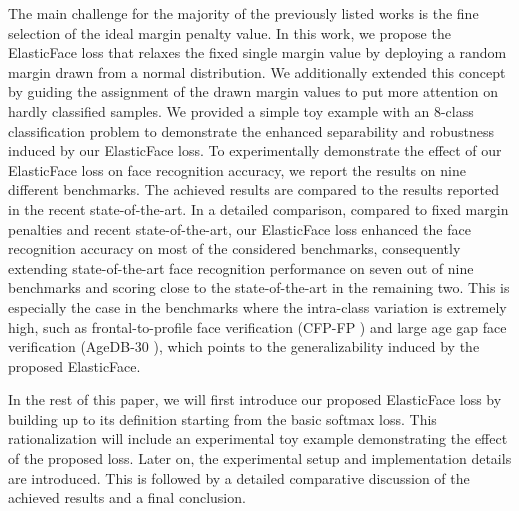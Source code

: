 \documentclass[letterpaper, 10 pt, conference]{ieeeconf}  \usepackage{times}
\begin{document}
The main challenge for the majority of the previously listed works is the fine selection of the ideal margin penalty value.
In this work, we propose the ElasticFace loss that relaxes the fixed single margin value by deploying a random margin drawn from a normal distribution. 
We additionally extended this concept by guiding the assignment of the drawn margin values to put more attention on hardly classified samples.
We provided a simple toy example with an 8-class classification problem to demonstrate the enhanced separability and robustness induced by our ElasticFace loss.
To experimentally demonstrate the effect of our ElasticFace loss on face recognition accuracy, we report the results on nine different benchmarks. 
The achieved results are compared to the results reported in the recent state-of-the-art.
In a detailed comparison, compared to fixed margin penalties and recent state-of-the-art, our ElasticFace loss enhanced the face recognition accuracy on most of the considered benchmarks, consequently extending state-of-the-art face recognition performance on seven out of nine benchmarks and scoring close to the state-of-the-art in the remaining two. This is especially the case in the benchmarks where the intra-class variation is extremely high, such as frontal-to-profile face verification (CFP-FP \cite{DBLP:conf/wacv/SenguptaCCPCJ16}) and large age gap face verification (AgeDB-30 \cite{DBLP:conf/cvpr/MoschoglouPSDKZ17}), which points to the generalizability induced by the proposed ElasticFace.

In the rest of this paper, we will first introduce our proposed ElasticFace loss by building up to its definition starting from the basic softmax loss. This rationalization will include an experimental toy example demonstrating the effect of the proposed loss. Later on, the experimental setup and implementation details are introduced. This is followed by a detailed comparative discussion of the achieved results and a final conclusion.
\end{document}
